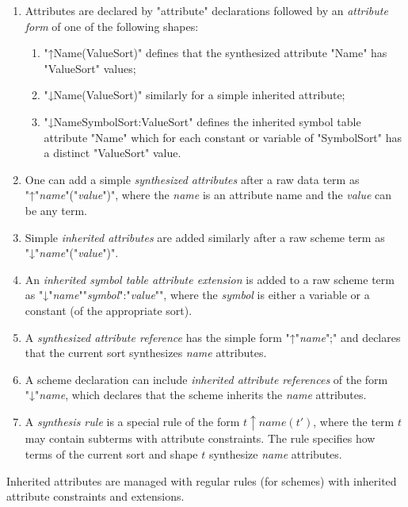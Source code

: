 \documentclass[11pt]{article} %
\begin{document}
\begin{manual}\leavevmode
  \begin{enumerate}

  \item Attributes are declared by "attribute" declarations followed by an \emph{attribute form} of
    one of the following shapes:
    \begin{enumerate}
    \item "↑Name(ValueSort)" defines that the synthesized attribute "Name" has "ValueSort" values;
    \item "↓Name(ValueSort)" similarly for a simple inherited attribute;
    \item "↓Name{SymbolSort:ValueSort}" defines the inherited symbol table attribute "Name" which
      for each constant or variable of "SymbolSort" has a distinct "ValueSort" value.
    \end{enumerate}

  \item One can add a simple \emph{synthesized attributes} after a raw data term as
    "↑"\emph{name}"("\emph{value}")", where the \emph{name} is an attribute name and the
    \emph{value} can be any term.

  \item Simple \emph{inherited attributes} are added similarly after a raw scheme term as
    "↓"\emph{name}"("\emph{value}")".

  \item An \emph{inherited symbol table attribute extension} is added to a raw scheme term as
    "↓"\emph{name}"{"\emph{symbol}":"\emph{value}"}", where the \emph{symbol} is either a variable
    or a constant (of the appropriate sort).

  \item A \emph{synthesized attribute reference} has the simple form "↑"\emph{name}";" and declares
    that the current sort synthesizes \emph{name} attributes.

  \item A scheme declaration can include \emph{inherited attribute references} of the form
    "↓"\emph{name}, which declares that the scheme inherits the \emph{name} attributes.

  \item A \emph{synthesis rule} is a special rule of the form $t↑name(t')$, where the term $t$ may
    contain subterms with attribute constraints. The rule specifies how terms of the current sort
    and shape $t$ synthesize \emph{name} attributes.

  \end{enumerate}
  Inherited attributes are managed with regular rules (for schemes) with inherited attribute
  constraints and extensions.
\end{manual}
\end{document}
